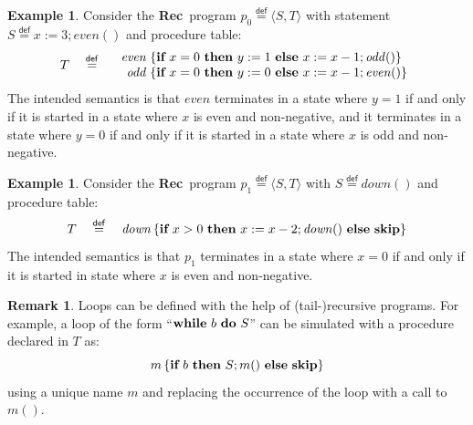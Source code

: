 \documentclass[10pt,a4paper]{amsart}
\theoremstyle{definition}
\newtheorem{example}[theorem]{Example}
\newtheorem{remark}[theorem]{Remark}
\newcommand{\defeq}{\stackrel{\mathsf{def}}{=}}
\newcommand{\set}[1]{\left\{ #1 \right\}}
\newcommand{\Rec}{\mbox{\bf Rec}}
\newcommand{\Skip}{\mbox{\bf skip}}
\newcommand{\If}{\mbox{\bf if}}
\newcommand{\Then}{\mbox{\bf then}}
\newcommand{\Else}{\mbox{\bf else}}
\newcommand{\While}{\mbox{\bf while}}
\newcommand{\Do}{\mbox{\bf do}}
\begin{document}
\begin{example}
\label{ex:rec-program}
  Consider the \Rec\ program $p_0\defeq\langle S, T\rangle$ with statement
  $S\defeq x := 3; \mathit{even} ()$ and procedure table:
  $$ T\quad\defeq\quad
  \begin{array}{r@{\;}l}
    \mathit{even} & \set{\If\ x = 0\ \Then\ y := 1\ \Else\ x := x-1; \mathit{odd} ()} \\
    \mathit{odd} & \set{\If\ x = 0\ \Then\ y := 0\ \Else\ x := x-1; \mathit{even} ()}
  \end{array}
  $$
  The intended semantics is that $\mathit{even}$ terminates in a state
  where $y=1$ if and only if it is started in a state where $x$ is
  even and non-negative, and it terminates in a state where $y=0$ if
  and only if it is started in a state where $x$ is odd and
  non-negative.
\end{example}

\begin{example}
\label{ex:rec-program-simple}
  Consider the \Rec\ program $p_1\defeq\langle S, T\rangle$ with
  $S\defeq\mathit{down}()$ and procedure table:
  $$ T\quad\defeq\quad
  \mathit{down} 
  \set{\If\ x > 0\ \Then\ x := x-2; \mathit{down}()\ \Else\ \Skip}
  $$
  The intended semantics is that $p_1$ terminates in a state where
  $x=0$ if and only if it is started in state where $x$ is even and
  non-negative.
\end{example}

\begin{remark}\label{rem:while-syn}
  Loops can be defined with the help of (tail-)recursive programs.
  For example, a loop of the form ``$\While\ b\ \Do\ S$'' can be
  simulated with a procedure declared in $T$ as:
  $$
  m\,\{\If\ b\ \Then\ S;m()\ \Else\ \Skip\}
  $$
  using a unique name $m$ and replacing the occurrence of the loop
  with a call to $m()$.
\end{remark}
\end{document}
